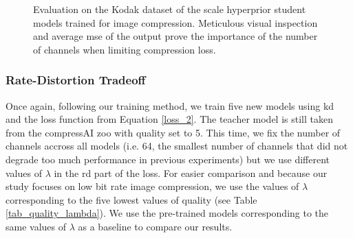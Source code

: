 \begin{figure}[H]
    \centering
    \qquad
    \caption[Evaluation on the Kodak dataset of the scale hyperprior student models trained for image compression.]{Evaluation on the Kodak dataset of the scale hyperprior student models trained for image compression. Meticulous visual inspection and average \acrshort{mse} of the output prove the importance of the number of channels when limiting compression loss.}
    \label{kd_lic_2}
\end{figure}

\subsubsection{Rate-Distortion Tradeoff}
Once again, following our training method, we train five new models using \acrshort{kd} and the loss function from Equation \ref{loss_2}. The teacher model is still taken from the compressAI zoo with \textsf{quality} set to 5. This time, we fix the number of channels accross all models (i.e. 64, the smallest number of channels that did not degrade too much performance in previous experiments) but we use different values of \(\lambda\) in the \acrshort{rd} part of the loss. For easier comparison and because our study focuses on low bit rate image compression, we use the values of \(\lambda\) corresponding to the five lowest values of \textsf{quality} (see Table \ref{tab_quality_lambda}). We use the pre-trained models corresponding to the same values of \(\lambda\) as a baseline to compare our results.

